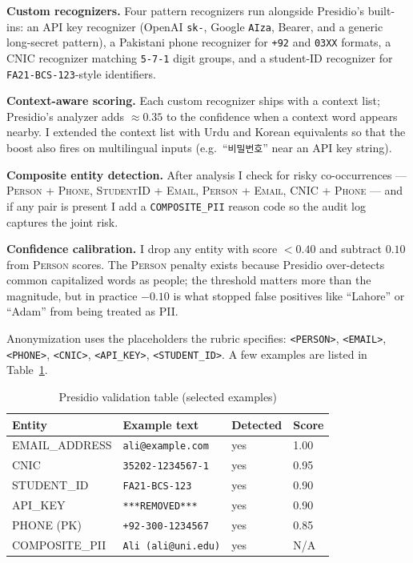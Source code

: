 \documentclass[conference]{IEEEtran}
\begin{document}
\textbf{Custom recognizers.} Four pattern recognizers run alongside
Presidio's built-ins: an API key recognizer (OpenAI \texttt{sk-},
Google \texttt{AIza}, Bearer, and a generic long-secret pattern), a
Pakistani phone recognizer for \texttt{+92} and \texttt{03XX} formats, a
CNIC recognizer matching \texttt{5-7-1} digit groups, and a student-ID
recognizer for \texttt{FA21-BCS-123}-style identifiers.

\textbf{Context-aware scoring.} Each custom recognizer ships with a
context list; Presidio's analyzer adds $\approx 0.35$ to the confidence
when a context word appears nearby. I extended the context list with
Urdu and Korean equivalents so that the boost also fires on multilingual
inputs (e.g.~``\texttt{비밀번호}'' near an API key string).

\textbf{Composite entity detection.} After analysis I check for risky
co-occurrences --- \textsc{Person + Phone}, \textsc{StudentID + Email},
\textsc{Person + Email}, \textsc{CNIC + Phone} --- and if any pair is
present I add a \texttt{COMPOSITE\_PII} reason code so the audit log
captures the joint risk.

\textbf{Confidence calibration.} I drop any entity with score $< 0.40$
and subtract $0.10$ from \textsc{Person} scores. The \textsc{Person}
penalty exists because Presidio over-detects common capitalized words
as people; the threshold matters more than the magnitude, but in
practice $-0.10$ is what stopped false positives like ``Lahore'' or
``Adam'' from being treated as PII.

Anonymization uses the placeholders the rubric specifies:
\texttt{<PERSON>}, \texttt{<EMAIL>}, \texttt{<PHONE>}, \texttt{<CNIC>},
\texttt{<API\_KEY>}, \texttt{<STUDENT\_ID>}. A few examples are listed
in Table~\ref{tab:presidio}.

\begin{table}[t]
\caption{Presidio validation table (selected examples)}
\label{tab:presidio}
\centering
\footnotesize
\begin{tabular}{p{1.4cm}p{2.3cm}p{1.2cm}p{1.0cm}}
\toprule
\textbf{Entity} & \textbf{Example text} & \textbf{Detected} & \textbf{Score} \\
\midrule
EMAIL\_ADDRESS & \texttt{ali@example.com}     & yes & 1.00 \\
CNIC           & \texttt{35202-1234567-1}     & yes & 0.95 \\
STUDENT\_ID    & \texttt{FA21-BCS-123}        & yes & 0.90 \\
API\_KEY       & \texttt{***REMOVED***} & yes & 0.90 \\
PHONE (PK)     & \texttt{+92-300-1234567}     & yes & 0.85 \\
COMPOSITE\_PII & \texttt{Ali (ali@uni.edu)}   & yes & N/A  \\
\bottomrule
\end{tabular}
\end{table}
\end{document}

